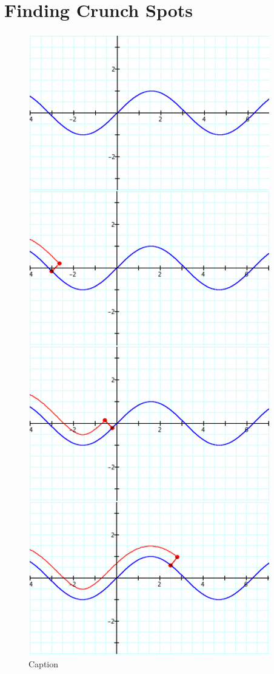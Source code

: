 \section{Finding Crunch Spots}

\begin{figure}
  \includegraphics[width=.9\linewidth]{findig-crunch-spots-img/Fig 17.png}
  \caption{Caption}
  \label{fig:fig17}
\end{figure}

